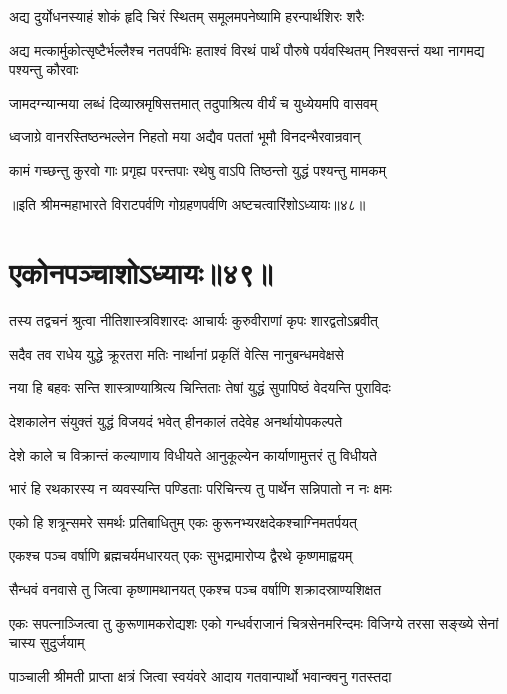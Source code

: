 \twolineshloka
{अद्य दुर्योधनस्याहं शोकं हृदि चिरं स्थितम्}
{समूलमपनेष्यामि हरन्पार्थशिरः शरैः}


\threelineshloka
{अद्य मत्कार्मुकोत्सृष्टैर्भल्लैश्च नतपर्वभिः}
{हताश्वं विरथं पार्थं पौरुषे पर्यवस्थितम्}
{निश्वसन्तं यथा नागमद्य पश्यन्तु कौरवाः}


\twolineshloka
{जामदग्न्यान्मया लब्धं दिव्यास्रमृषिसत्तमात्}
{तदुपाश्रित्य वीर्यं च युध्येयमपि वासवम्}


\twolineshloka
{ध्वजाग्रे वानरस्तिष्ठन्भल्लेन निहतो मया}
{अद्यैव पततां भूमौ विनदन्भैरवान्रवान्}


\twolineshloka
{कामं गच्छन्तु कुरवो गाः प्रगृह्य परन्तपाः}
{रथेषु वाऽपि तिष्ठन्तो युद्धं पश्यन्तु मामकम्}

॥इति श्रीमन्महाभारते विराटपर्वणि गोग्रहणपर्वणि अष्टचत्वारिंशोऽध्यायः॥४८॥

\chapter{एकोनपञ्चाशोऽध्यायः॥४९॥}

\twolineshloka
{तस्य तद्वचनं श्रुत्वा नीतिशास्त्रविशारदः}
{आचार्यः कुरुवीराणां कृपः शारद्वतोऽब्रवीत्}


\twolineshloka
{सदैव तव राधेय युद्धे क्रूरतरा मतिः}
{नार्थानां प्रकृतिं वेत्सि नानुबन्धमवेक्षसे}


\twolineshloka
{नया हि बहवः सन्ति शास्त्राण्याश्रित्य चिन्तिताः}
{तेषां युद्धं सुपापिष्ठं वेदयन्ति पुराविदः}


\twolineshloka
{देशकालेन संयुक्तं युद्धं विजयदं भवेत्}
{हीनकालं तदेवेह अनर्थायोपकल्पते}


\twolineshloka
{देशे काले च विक्रान्तं कल्याणाय विधीयते}
{आनुकूल्येन कार्याणामुत्तरं तु विधीयते}


\twolineshloka
{भारं हि रथकारस्य न व्यवस्यन्ति पण्डिताः}
{परिचिन्त्य तु पार्थेन सन्निपातो न नः क्षमः}


\twolineshloka
{एको हि शत्रून्समरे समर्थः प्रतिबाधितुम्}
{एकः कुरूनभ्यरक्षदेकश्चाग्निमतर्पयत्}


\twolineshloka
{एकश्च पञ्च वर्षाणि ब्रह्मचर्यमधारयत्}
{एकः सुभद्रामारोप्य द्वैरथे कृष्णमाह्वयम्}


\twolineshloka
{सैन्धवं वनवासे तु जित्वा कृष्णामथानयत्}
{एकश्च पञ्च वर्षाणि शक्रादस्राण्यशिक्षत}


\threelineshloka
{एकः सपत्नाञ्जित्वा तु कुरूणामकरोद्यशः}
{एको गन्धर्वराजानं चित्रसेनमरिन्दमः}
{विजिग्ये तरसा सङ्ख्ये सेनां चास्य सुदुर्जयाम्}


\twolineshloka
{पाञ्चाली श्रीमती प्राप्ता क्षत्रं जित्वा स्वयंवरे}
{आदाय गतवान्पार्थो भवान्क्वनु गतस्तदा}


